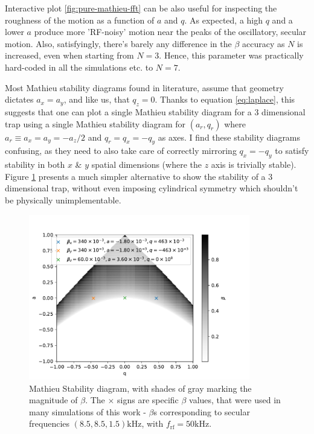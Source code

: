 Interactive plot \ref{fig:pure-mathieu-fft} can be also useful for inspecting the roughness of the motion as a function of $a$ and $q$. As expected, a high $q$ and a lower $a$ produce more 'RF-noisy' motion near the peaks of the oscillatory, secular motion. Also, satisfyingly, there's barely any difference in the $\beta$ accuracy as $N$ is increased, even when starting from $N=3$. Hence, this parameter was practically hard-coded in all the simulations etc. to $N=7$.

Most Mathieu stability diagrams found in literature, assume that geometry dictates $a_x = a_y$, and like us, that $q_z = 0$. Thanks to equation \ref{eq:laplace}, this suggests that one can plot a single Mathieu stability diagram for a 3 dimensional trap using a single Mathieu stability diagram for $(a_r,q_r)$ where $a_r \equiv a_x = a_y = -a_z/2$ and $q_r = q_x = -q_y$ as axes. I find these stability diagrams confusing, as they need to also take care of correctly mirroring $q_x = -q_y$ to satisfy stability in both $x$ \& $y$ spatial dimensions (where the $z$ axis is trivially stable). Figure \ref{fig:mathieu-stability} presents a much simpler alternative to show the stability of a 3 dimensional trap, without even imposing cylindrical symmetry which shouldn't be physically unimplementable.

\begin{figure}
	\begin{center}
		\includegraphics[width=0.86\textwidth]{graphics/pure-mathieu-stability.pdf}
	\end{center}
	\caption{Mathieu Stability diagram, with shades of gray marking the magnitude of $\beta$. The $\times$ signs are specific $\beta$ values, that were used in many simulations of this work - $\beta$s corresponding to secular frequencies $(8.5, 8.5, 1.5)\mathrm{kHz}$, with $f_\mathrm{rf} = 50\mathrm{kHz}$.}
	\label{fig:mathieu-stability}
\end{figure}

